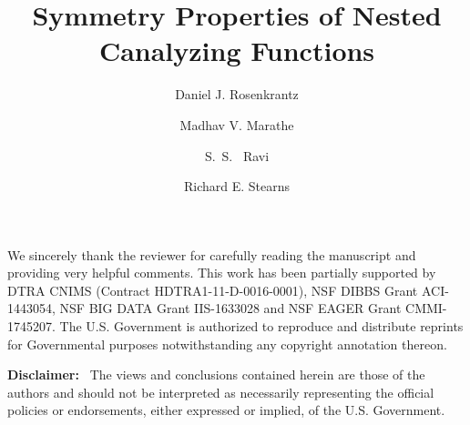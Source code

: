 \documentclass[
submission
]{dmtcs-episciences}
\author{Daniel J. Rosenkrantz\affiliationmark{1}
  \and Madhav V. Marathe\affiliationmark{2}%
  \and S.~S.~ Ravi\affiliationmark{1}%
  \and Richard E. Stearns\affiliationmark{1}
}
\title[Symmetry and NCFs]
      {Symmetry Properties of Nested Canalyzing Functions}
\affiliation{
  Biocomplexity Institute and Initiative, University of Virginia and
  Department of Computer Science, University at Albany 
  -- State University of New York, USA\\
  Biocomplexity Institute and Initiative \& Department of 
  Computer Science, University of Virginia, USA
}
\begin{document}
\maketitle




\newcommand{\QED}{\hfill\rule{2mm}{2mm}}

\newcommand{\cpoly}{\textbf{P}}
\newcommand{\cnp}{\textbf{NP}}
\newcommand{\cnump}{\textbf{\#P}}
\newcommand{\wtg}{\mbox{$\mathcal{G}$}}

\newcommand{\arr}{\mbox{$\:\longrightarrow\:$}}

\smallskip

\begin{abstract}

\end{abstract}






\acknowledgments
We sincerely thank the reviewer for carefully
reading the manuscript and providing very helpful comments.
This work has been partially supported by
DTRA CNIMS (Contract HDTRA1-11-D-0016-0001),
NSF DIBBS Grant ACI-1443054, 
NSF BIG DATA Grant IIS-1633028 and
NSF EAGER Grant CMMI-1745207.
The U.S. Government is authorized to reproduce and
distribute reprints for Governmental purposes notwithstanding
any copyright annotation thereon.

\bigskip%

\medskip

\noindent
\textbf{Disclaimer:}~ The views and conclusions contained
herein are those of the authors and should
not be interpreted as necessarily representing the
official policies or endorsements, either expressed
or implied, of the U.S. Government.



%

\end{document}
